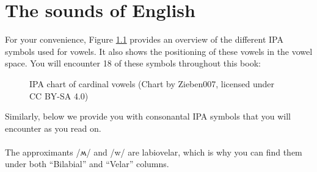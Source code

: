 \chapter{The sounds of English}\label{sounds}

\noindent For your convenience, Figure \ref{fig:IPA-vowels} provides an overview of the different IPA symbols used for vowels. It also shows the positioning of these vowels in the vowel space. You will encounter 18 of these symbols throughout this book:

\begin{figure}[H]
    \begin{vowel}
\end{vowel}

    \caption{IPA chart of cardinal vowels (Chart by Zieben007, licensed under CC BY-SA 4.0)}
    \label{fig:IPA-vowels}
\end{figure}

\noindent Similarly, below we provide you with consonantal IPA symbols that you will encounter as you read on.\medskip\\ 
\noindent
{}\medskip\\
\noindent The approximants /ʍ/ and /w/ are labiovelar, which is why you can find them under both ``Bilabial'' and ``Velar'' columns.
